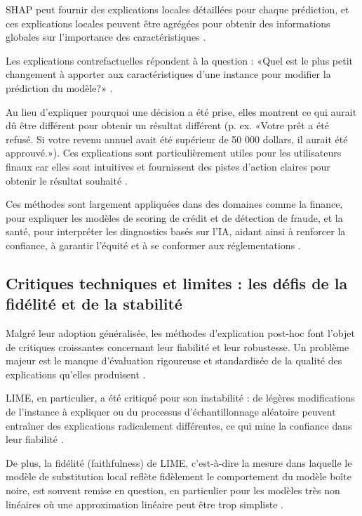 SHAP peut fournir des explications locales détaillées pour chaque prédiction, et ces explications locales peuvent être agrégées pour obtenir des informations globales sur l'importance des caractéristiques \citep{Siganos2017}.

Les explications contrefactuelles répondent à la question : «Quel est le plus petit changement à apporter aux caractéristiques d'une instance pour modifier la prédiction du modèle?» \citet{Wachter2017}.

Au lieu d'expliquer pourquoi une décision a été prise, elles montrent ce qui aurait dû être différent pour obtenir un résultat différent (p. ex. «Votre prêt a été refusé. Si votre revenu annuel avait été supérieur de 50 000 dollars, il aurait été approuvé.»). Ces explications sont particulièrement utiles pour les utilisateurs finaux car elles sont intuitives et fournissent des pistes d'action claires pour obtenir le résultat souhaité \citep{Verma2020}.

Ces méthodes sont largement appliquées dans des domaines comme la finance, pour expliquer les modèles de scoring de crédit et de détection de fraude, et la santé, pour interpréter les diagnostics basés sur l'IA, aidant ainsi à renforcer la confiance, à garantir l'équité et à se conformer aux réglementations \citep{Bussmann2020a, Misheva2021}.
\subsection{Critiques techniques et limites : les défis de la fidélité et de la stabilité}
Malgré leur adoption généralisée, les méthodes d'explication post-hoc font l'objet de critiques croissantes concernant leur fiabilité et leur robustesse. Un problème majeur est le manque d'évaluation rigoureuse et standardisée de la qualité des explications qu'elles produisent \citep{Sankarapu2024, Räuker2023}.

LIME, en particulier, a été critiqué pour son instabilité : de légères modifications de l'instance à expliquer ou du processus d'échantillonnage aléatoire peuvent entraîner des explications radicalement différentes, ce qui mine la confiance dans leur fiabilité \citep{AlvarezMelis2018, Visani2023}.

De plus, la fidélité (faithfulness) de LIME, c'est-à-dire la mesure dans laquelle le modèle de substitution local reflète fidèlement le comportement du modèle boîte noire, est souvent remise en question, en particulier pour les modèles très non linéaires où une approximation linéaire peut être trop simpliste \citep{Rudin2019, Plumb2018}.

